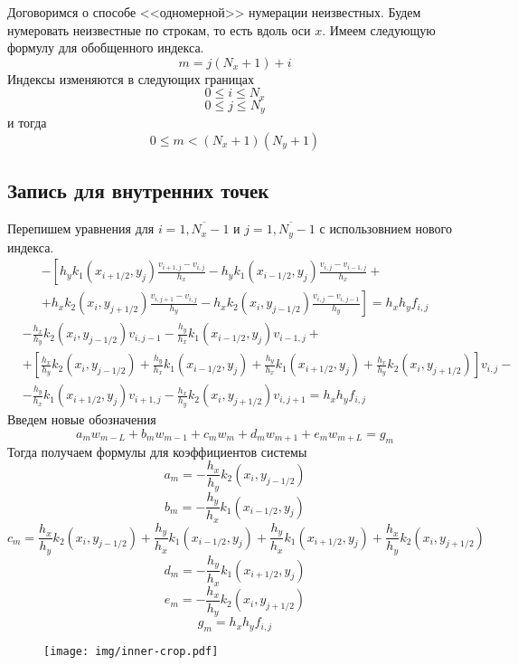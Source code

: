 Договоримся о способе <<одномерной>> нумерации неизвестных.
Будем нумеровать неизвестные по строкам, то есть вдоль оси $x$.
Имеем следующую формулу для обобщенного индекса.
\[ m = j (N_x + 1) + i \]
Индексы изменяются в следующих границах
\[ 0 \leq i \leq N_x \]
\[ 0 \leq j \leq N_y \]
и тогда
\[ 0 \leq m < (N_x + 1) (N_y + 1) \]

\subsection{Запись для внутренних точек}
Перепишем уравнения для $i = \overline{1,N_x-1}$ и $j = \overline{1,N_y-1}$ с использовнием нового индекса.
\begin{multline*}
    - \left[
    h_y k_1(x_{i+1/2},y_{j}) \frac{v_{i+1,j} - v_{i,j}}{h_x} - h_y k_1(x_{i-1/2},y_{j}) \frac{v_{i,j} - v_{i-1,j}}{h_x} + \right. \\
    \left. +
    h_x k_2(x_{i},y_{j+1/2}) \frac{v_{i,j+1} - v_{i,j}}{h_y} - h_x k_2(x_{i},y_{j-1/2}) \frac{v_{i,j} - v_{i,j-1}}{h_y}
    \right] =
    h_x h_y f_{i,j}
\end{multline*}
\[
\begin{split}
    &-\frac{h_x}{h_y} k_2(x_{i},y_{j-1/2}) v_{i,j-1} - \frac{h_y}{h_x} k_1(x_{i-1/2},y_{j}) v_{i-1,j} + \\
    &+\left[ \frac{h_x}{h_y} k_2(x_{i},y_{j-1/2}) + \frac{h_y}{h_x} k_1(x_{i-1/2},y_{j}) + \frac{h_y}{h_x} k_1(x_{i+1/2},y_{j}) + \frac{h_x}{h_y} k_2(x_{i},y_{j+1/2}) \right] v_{i,j} - \\
    &-\frac{h_y}{h_x} k_1(x_{i+1/2},y_{j}) v_{i+1,j} - \frac{h_x}{h_y} k_2(x_{i},y_{j+1/2}) v_{i,j+1} = h_x h_y f_{i,j}
\end{split}
\]
Введем новые обозначения
\[ a_m w_{m - L} + b_m w_{m - 1} + c_m w_m + d_m w_{m + 1} + e_m w_{m + L} = g_m \]
Тогда получаем формулы для коэффициентов системы
\[ a_m = -\frac{h_x}{h_y} k_2(x_{i},y_{j-1/2}) \]
\[ b_m = -\frac{h_y}{h_x} k_1(x_{i-1/2},y_{j}) \]
\[ c_m = \frac{h_x}{h_y} k_2(x_{i},y_{j-1/2}) + \frac{h_y}{h_x} k_1(x_{i-1/2},y_{j}) + \frac{h_y}{h_x} k_1(x_{i+1/2},y_{j}) + \frac{h_x}{h_y} k_2(x_{i},y_{j+1/2}) \]
\[ d_m = -\frac{h_y}{h_x} k_1(x_{i+1/2},y_{j}) \]
\[ e_m = -\frac{h_x}{h_y} k_2(x_{i},y_{j+1/2}) \]
\[ g_m = h_x h_y f_{i,j} \]
\begin{figure}[H]
    \centering
    \texttt{[image: img/inner-crop.pdf]}
\end{figure}

